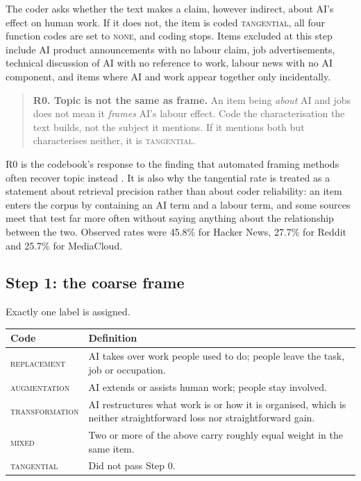 The coder asks whether the text makes a claim, however indirect, about AI's
effect on human work. If it does not, the item is coded \textsc{tangential},
all four function codes are set to \textsc{none}, and coding stops. Items
excluded at this step include AI product announcements with no labour claim, job
advertisements, technical discussion of AI with no reference to work, labour
news with no AI component, and items where AI and work appear together only
incidentally.

\begin{quote}
\textbf{R0. Topic is not the same as frame.} An item being \emph{about} AI and
jobs does not mean it \emph{frames} AI's labour effect. Code the
characterisation the text builds, not the subject it mentions. If it mentions
both but characterises neither, it is \textsc{tangential}.
\end{quote}

R0 is the codebook's response to the finding that automated framing methods
often recover topic instead \cite{nicholls2021}. It is also why the tangential
rate is treated as a statement about retrieval precision rather than about coder
reliability: an item enters the corpus by containing an AI term and a labour
term, and some sources meet that test far more often without saying anything
about the relationship between the two. Observed rates were 45.8\% for Hacker
News, 27.7\% for Reddit and 25.7\% for MediaCloud.

\subsection{Step 1: the coarse frame}

Exactly one label is assigned.

\begin{table}[htbp]\centering
\small
\begin{tabular}{p{2.6cm}p{11.4cm}}
\toprule
Code & Definition\\
\midrule
\textsc{replacement}    & AI takes over work people used to do; people leave the task, job or occupation.\\
\textsc{augmentation}   & AI extends or assists human work; people stay involved.\\
\textsc{transformation} & AI restructures what work is or how it is organised, which is neither straightforward loss nor straightforward gain.\\
\textsc{mixed}          & Two or more of the above carry roughly equal weight in the same item.\\
\textsc{tangential}     & Did not pass Step 0.\\
\bottomrule
\end{tabular}
\end{table}

